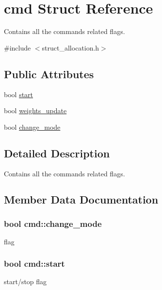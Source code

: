 \hypertarget{structcmd}{}\section{cmd Struct Reference}
\label{structcmd}


Contains all the commands related flags.  




{\ttfamily \#include $<$struct\+\_\+allocation.\+h$>$}

\subsection*{Public Attributes}
\begin{DoxyCompactItemize}
\item 
bool \hyperlink{structcmd_a69bbcf2fbb2f190a8e2fdb9f7a2c3f1d}{start}
\item 
bool \hyperlink{structcmd_a7e1778b3fc9c612adf2fa1bdf6bd2de6}{weights\+\_\+update}
\item 
bool \hyperlink{structcmd_a80e86b63b45d8f902497268145db602a}{change\+\_\+mode}
\end{DoxyCompactItemize}


\subsection{Detailed Description}
Contains all the commands related flags. 

\subsection{Member Data Documentation}
\subsubsection[{\texorpdfstring{change\+\_\+mode}{change_mode}}]{\setlength{\rightskip}{0pt plus 5cm}bool cmd\+::change\+\_\+mode}\hypertarget{structcmd_a80e86b63b45d8f902497268145db602a}{}\label{structcmd_a80e86b63b45d8f902497268145db602a}
flag 
\subsubsection[{\texorpdfstring{start}{start}}]{\setlength{\rightskip}{0pt plus 5cm}bool cmd\+::start}\hypertarget{structcmd_a69bbcf2fbb2f190a8e2fdb9f7a2c3f1d}{}\label{structcmd_a69bbcf2fbb2f190a8e2fdb9f7a2c3f1d}
start/stop flag 
